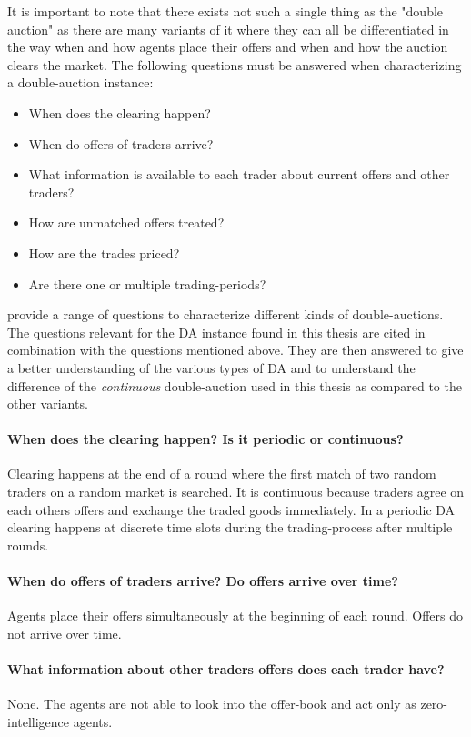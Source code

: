 \documentclass[../Bachelorarbeit.tex]{subfiles}
\begin{document}
\medskip
It is important to note that there exists not such a single thing as the "double auction" as there are many variants of it where they can all be differentiated in the way when and how agents place their offers and when and how the auction clears the market. The following questions must be answered when characterizing a double-auction instance:

\begin{itemize}
\item When does the clearing happen?
\item When do offers of traders arrive?
\item What information is available to each trader about current offers and other traders?
\item How are unmatched offers treated?
\item How are the trades priced?
\item Are there one or multiple trading-periods?
\end{itemize}

\cite{Parsons2006} provide a range of questions to characterize different kinds of double-auctions. The questions relevant for the DA instance found in this thesis are cited in combination with the questions mentioned above. They are then answered to give a better understanding of the various types of DA and to understand the difference of the \textit{continuous} double-auction used in this thesis as compared to the other variants.

\paragraph{When does the clearing happen? Is it periodic or continuous?} Clearing happens at the end of a round where the first match of two random traders on a random market is searched. It is continuous because traders agree on each others offers and exchange the traded goods immediately. In a periodic DA clearing happens at discrete time slots during the trading-process after multiple rounds.

\paragraph{When do offers of traders arrive? Do offers arrive over time?} Agents place their offers simultaneously at the beginning of each round. Offers do not arrive over time.

\paragraph{What information about other traders offers does each trader have?} None. The agents are not able to look into the offer-book and act only as \gls{zero-intelligence agents}.
\end{document}
